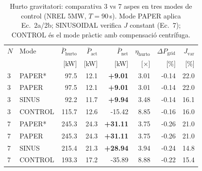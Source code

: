 \begin{table}[htbp]
\centering
\caption{Hurto gravitatori: comparativa 3 vs 7 aspes en tres modes de control (NREL 5MW, $T=90$\,s). Mode PAPER aplica Ec.~2a/2b; SINUSOIDAL verifica $J$ constant (Ec.~7); CONTROL és el mode pràctic amb compensació centrífuga.}
\label{tab:hurto_3vs7}
\begin{tabular}{llrrrrrr}
\toprule
$N$ & Mode & $\bar{P}_{\text{hurto}}$ & $\bar{P}_{\text{act}}$ & $\bar{P}_{\text{net}}$ & $\eta_{\text{hurto}}$ & $\Delta P_{\text{grid}}$ & $J_{\text{var}}$ \\
 & & [kW] & [kW] & [kW] & [$\times$] & [\%] & [\%] \\
\midrule
3 & PAPER* & 97.5 & 12.1 & \textbf{+9.01} & 3.01 & -0.14 & 22.0 \\
3 & PAPER & 97.5 & 12.1 & \textbf{+9.01} & 3.01 & -0.14 & 22.0 \\
3 & SINUS & 92.2 & 11.7 & \textbf{+9.94} & 3.48 & -0.14 & 16.1 \\
3 & CONTROL & 115.7 & 12.6 & -15.42 & 8.85 & -0.16 & 16.0 \\
\midrule
7 & PAPER* & 245.3 & 24.3 & \textbf{+31.11} & 3.75 & -0.26 & 21.0 \\
7 & PAPER & 245.3 & 24.3 & \textbf{+31.11} & 3.75 & -0.26 & 21.0 \\
7 & SINUS & 215.4 & 21.3 & \textbf{+28.94} & 3.94 & -0.24 & 14.8 \\
7 & CONTROL & 193.3 & 17.2 & -35.89 & 8.88 & -0.22 & 15.4 \\
\bottomrule
\end{tabular}
\end{table}
